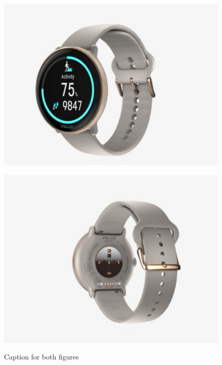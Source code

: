 \documentclass{article}
\begin{document}
\begin{figure}[h]
\begin{minipage}{0.5\textwidth}
\includegraphics[width=\linewidth]{watch1.png}
\label{fig:sub1}
\end{minipage}
\begin{minipage}{0.5\textwidth}
\includegraphics[width=\linewidth]{watch2.png}
\label{fig:sub2}
\end{minipage}
\caption{Caption for both figures}
\label{fig:test}
\end{figure}
\end{document}
